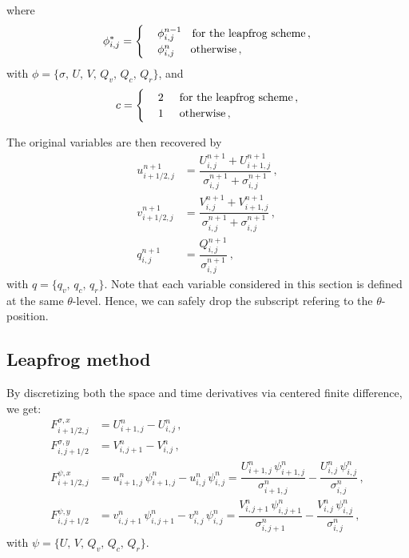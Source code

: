 \documentclass{article}
\numberwithin{equation}{section}
\begin{document}
		where 
		\[
			\phi_{i,j}^* = 
			\begin{cases}
				& \phi_{i,j}^{n-1} \hspace*{0.33cm} \text{for the leapfrog scheme} \, , \\
				& \phi_{i,j}^n \hspace*{0.5cm} \text{otherwise} \, ,
			\end{cases}
		\]
		with $\phi = \lbrace \sigma, \, U, \, V, \, Q_v, \, Q_c, \, Q_r \rbrace$, and
		\[
			c = 
			\begin{cases}
				& 2 \hspace*{0.5cm} \text{for the leapfrog scheme} \, , \\
				& 1 \hspace*{0.5cm} \text{otherwise} \, ,
			\end{cases}
		\]
		 
		
		The original variables are then recovered by
		\begin{subequations}
			\begin{align}
				u_{i+1/2,j}^{n+1} & = \dfrac{U_{i,j}^{n+1} + U_{i+1,j}^{n+1}}{\sigma_{i,j}^{n+1} + \sigma_{i,j}^{n+1}} \, , \\
				v_{i+1/2,j}^{n+1} & = \dfrac{V_{i,j}^{n+1} + V_{i+1,j}^{n+1}}{\sigma_{i,j}^{n+1} + \sigma_{i,j}^{n+1}} \, , \\
				q_{i,j}^{n+1} & = \dfrac{Q_{i,j}^{n+1}}{\sigma_{i,j}^{n+1}} \, ,
			\end{align}
		\end{subequations}
		with $q = \lbrace q_v, \, q_c, \, q_r \rbrace$. Note that each variable considered in this section is defined at the same $\theta$-level. Hence, we can safely drop the subscript refering to the $\theta$-position.

	\subsection{Leapfrog method}
	\label{section:Leapfrog method}
		By discretizing both the space and time derivatives via centered finite difference, we get:
		\begin{subequations}
			\begin{align}
				F_{i+1/2,j}^{\sigma,x} & = U_{i+1,j}^n - U_{i,j}^n \, , \\
				F_{i,j+1/2}^{\sigma,y} & = V_{i,j+1}^n - V_{i,j}^n \, , \\
				F_{i+1/2,j}^{\psi,x} & = u_{i+1,j}^n \, \psi_{i+1,j}^n - u_{i,j}^n \, \psi_{i,j}^n = \dfrac{U_{i+1,j}^n \, \psi_{i+1,j}^n}{\sigma_{i+1,j}^n} - \dfrac{U_{i,j}^n \, \psi_{i,j}^n}{\sigma_{i,j}^n} \, , \\
				F_{i,j+1/2}^{\psi,y} & = v_{i,j+1}^n \, \psi_{i,j+1}^n - v_{i,j}^n \, \psi_{i,j}^n = \dfrac{V_{i,j+1}^n \, \psi_{i,j+1}^n}{\sigma_{i,j+1}^n} - \dfrac{V_{i,j}^n \, \psi_{i,j}^n}{\sigma_{i,j}^n} \, ,
			\end{align}
		\end{subequations}
		with $\psi = \lbrace U, \, V, \, Q_v, \, Q_c, \, Q_r \rbrace$.
\end{document}
